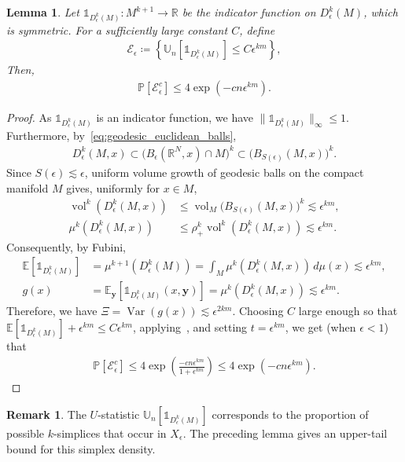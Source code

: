 \documentclass[11pt,reqno]{amsproc}
\numberwithin{equation}{section}
\newcommand{\R}{\mathbb{R}}
\newcommand{\E}{\mathbb{E}}
\newcommand{\U}{\mathbb{U}}
\newcommand{\PP}{\mathbb{P}}
\newcommand{\one}{\mathbb{1}}
\newcommand{\by}{\mathbf{y}}
\newcommand{\cE}{\mathcal{E}}
\newcommand{\ls}{\lesssim}
\newcommand{\vol}{\operatorname{vol}}
\newcommand{\Var}{\operatorname{Var}}
\newcommand{\ball}[3]{B_{#3}(#1, #2)} %
\newtheorem{lemma}[counter]{Lemma}
\theoremstyle{definition}
\newtheorem{remark}[counter]{Remark}
\theoremstyle{plain}
\begin{document}
    \begin{lemma} \label{lem:concentration_D_k_support}
        Let $\one_{D^k_\epsilon(M)} : M^{k+1} \to \R$ be the indicator function on $D^k_\epsilon(M)$, which is symmetric. For a sufficiently large constant $C$, define
        \begin{align}
            \cE_\epsilon \coloneqq \left\{ \U_n[\one_{D^k_\epsilon(M)}] \leq C\epsilon^{km}\right\},
        \end{align}
        Then,
        \begin{align}
            \PP[\cE_\epsilon^c] \leq 4 \exp \left(-cn\epsilon^{km}\right).
        \end{align}
    \end{lemma}
    \begin{proof}
        As $\one_{D^k_\epsilon(M)}$ is an indicator function, we have $\|\one_{D^k_\epsilon(M)}\|_\infty \leq 1$. Furthermore, by~\eqref{eq:geodesic_euclidean_balls},
        \begin{align}
            D_\epsilon^k(M,x)
            \subset \big(\ball{\R^N}{x}{\epsilon}\cap M\big)^k
            \subset \big(\ball{M}{x}{S(\epsilon)}\big)^k.
        \end{align}
        Since $S(\epsilon)\ls\epsilon$, uniform volume growth of geodesic balls on the compact manifold $M$ gives, uniformly for $x\in M$,
        \begin{align} \label{eq:fat_diagonal_fiber_volume}
            \vol^k(D_\epsilon^k(M,x))
            &\leq \vol_M\big(\ball{M}{x}{S(\epsilon)}\big)^k
            \ls \epsilon^{km}, \\
            \mu^k(D_\epsilon^k(M,x))
            &\leq \rho_+^k\vol^k(D_\epsilon^k(M,x))
            \ls \epsilon^{km}.
        \end{align}
        Consequently, by Fubini,
        \begin{align}
            \E[\one_{D^k_\epsilon(M)}]
            &=\mu^{k+1}(D^k_\epsilon(M))
            =\int_M\mu^k(D^k_\epsilon(M,x))\,d\mu(x)
            \ls\epsilon^{km}, \\
            g(x)&=\E_{\by}[\one_{D^k_\epsilon(M)}(x,\by)]
            =\mu^k(D^k_\epsilon(M,x))
            \ls\epsilon^{km}.
        \end{align}
        Therefore, we have $\Xi = \Var(g(x)) \ls \epsilon^{2km}$. Choosing $C$ large enough so that $\E[\one_{D^k_\epsilon(M)}] + \epsilon^{km} \leq C\epsilon^{km}$, applying~, and setting $t = \epsilon^{km}$, we get (when $\epsilon < 1$) that
        \begin{align}
            \PP[\cE_\epsilon^c]  \leq 4 \exp \left( \frac{-cn\epsilon^{km}}{1 + \epsilon^{km}}\right) \leq 4 \exp \left(-cn\epsilon^{km}\right).
        \end{align}
    \end{proof}
    \begin{remark}
        The $U$-statistic $\U_n[\one_{D_\epsilon^k(M)}]$ corresponds to the proportion of possible $k$-simplices that occur in $X_\epsilon$. The preceding lemma gives an upper-tail bound for this simplex density.
    \end{remark}
\end{document}
